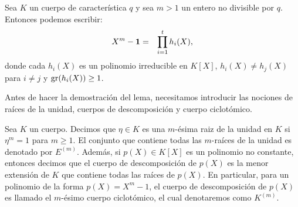 	\begin{lemma}\label{lema-polinomio_separable}
		Sea $K$ un cuerpo de característica $q$ y sea $m>1$
                un entero no divisible por $q$.
                Entonces podemos escribir:
	\begin{eqnarray*}
		X^m-\mathbf{1} & = & \prod_{i=1}^{t}h_i(X), 
		\end{eqnarray*}
		donde cada $h_i(X)$ es un polinomio irreducible en $K[X]$,
$h_i(X)\neq h_j(X)$ para $i\neq j$ y ${\rm gr}(h_i(X)) \geq 1$.		 
	\end{lemma}
Antes de hacer la demostración del lema, necesitamos introducir las
nociones de raíces de la unidad, cuerpos de descomposición y cuerpo
ciclotómico.        
\begin{definition}\label{c. de descomposicion, ciclotomico def}
Sea $K$ un cuerpo. Decimos que $\eta\in K$ es una $m$-ésima raiz de la
unidad en $K$ si $\eta^m=1$ para $m\geq 1$. El conjunto que contiene
todas las $m$-raíces de la unidad es denotado por $E^{(m)}$.  Además,
si $p(X)\in K[X]$ es un polinomio no constante, entonces decimos que
el cuerpo de descomposición de $p(X)$ es la menor extensión de $K$ que
contiene todas las raíces de $p(X)$. En particular, para un polinomio
de la forma $p(X)=X^m-1$, el cuerpo de descomposición de $p(X)$ es
llamado
el $m$-ésimo cuerpo ciclotómico, el cual denotaremos como $K^{(m)}$.
\end{definition}

